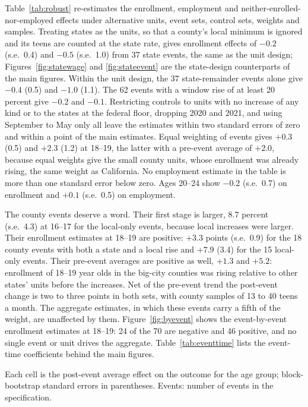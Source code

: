 \documentclass[12pt]{article}
\begin{document}
Table~\ref{tab:robust} re-estimates the enrollment, employment and neither-enrolled-nor-employed effects under alternative units, event sets, control sets, weights and samples. Treating states as the units, so that a county's local minimum is ignored and its teens are counted at the state rate, gives enrollment effects of $-0.2$ (s.e.\ 0.4) and $-0.5$ (s.e.\ 1.0) from 37 state events, the same as the unit design; Figures~\ref{fig:statewage} and \ref{fig:stateevent} are the state-design counterparts of the main figures. Within the unit design, the 37 state-remainder events alone give $-0.4$ (0.5) and $-1.0$ (1.1). The 62 events with a window rise of at least 20 percent give $-0.2$ and $-0.1$. Restricting controls to units with no increase of any kind or to the states at the federal floor, dropping 2020 and 2021, and using September to May only all leave the estimates within two standard errors of zero and within a point of the main estimates. Equal weighting of events gives $+0.3$ (0.5) and $+2.3$ (1.2) at 18--19, the latter with a pre-event average of $+2.0$, because equal weights give the small county units, whose enrollment was already rising, the same weight as California. No employment estimate in the table is more than one standard error below zero. Ages 20--24 show $-0.2$ (s.e.\ 0.7) on enrollment and $+0.1$ (s.e.\ 0.5) on employment.

The county events deserve a word. Their first stage is larger, 8.7 percent (s.e.\ 4.3) at 16--17 for the local-only events, because local increases were larger. Their enrollment estimates at 18--19 are positive: $+3.3$ points (s.e.\ 0.9) for the 18 county events with both a state and a local rise and $+7.9$ (3.4) for the 15 local-only events. Their pre-event averages are positive as well, $+1.3$ and $+5.2$: enrollment of 18--19 year olds in the big-city counties was rising relative to other states' units before the increases. Net of the pre-event trend the post-event change is two to three points in both sets, with county samples of 13 to 40 teens a month. The aggregate estimates, in which these events carry a fifth of the weight, are unaffected by them. Figure~\ref{fig:byevent} shows the event-by-event enrollment estimates at 18--19: 24 of the 70 are negative and 46 positive, and no single event or unit drives the aggregate. Table~\ref{tab:eventtime} lists the event-time coefficients behind the main figures.

\begin{table}[H]
\centering
\caption{Robustness: post-event averages under alternative units, event sets, controls, weights and samples}
\label{tab:robust}
\footnotesize

\begin{tablenotes}\scriptsize
\item Each cell is the post-event average effect on the outcome for the age group; block-bootstrap standard errors in parentheses. Events: number of events in the specification.
\end{tablenotes}
\end{table}
\end{document}
